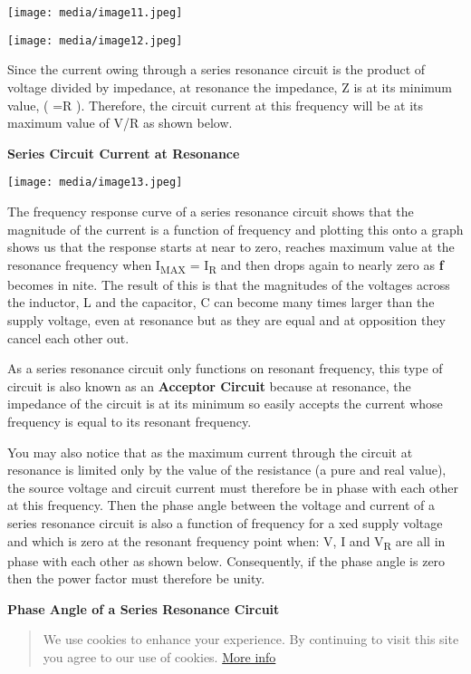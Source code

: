 \documentclass[]{article}
\begin{document}
\texttt{[image: media/image11.jpeg]}

\texttt{[image: media/image12.jpeg]}

Since the current owing through a series resonance circuit is the
product of voltage divided by impedance, at resonance the impedance, Z
is at its minimum value, ( =R ). Therefore, the circuit current at this
frequency will be at its maximum value of V/R as shown below.

\textbf{Series Circuit Current at Resonance}

\texttt{[image: media/image13.jpeg]}

The frequency response curve of a series resonance circuit shows that
the magnitude of the current is a function of frequency and plotting
this onto a graph shows us that the response starts at near to zero,
reaches maximum value at the resonance frequency when
I\textsubscript{MAX} = I\textsubscript{R} and then drops again to nearly
zero as \textbf{ƒ} becomes in nite. The result of this is that the
magnitudes of the voltages across the inductor, L and the capacitor, C
can become many times larger than the supply voltage, even at resonance
but as they are equal and at opposition they cancel each other out.

As a series resonance circuit only functions on resonant frequency, this
type of circuit is also known as an \textbf{Acceptor Circuit} because at
resonance, the impedance of the circuit is at its minimum so easily
accepts the current whose frequency is equal to its resonant frequency.

You may also notice that as the maximum current through the circuit at
resonance is limited only by the value of the resistance (a pure and
real value), the source voltage and circuit current must therefore be in
phase with each other at this frequency. Then the phase angle between
the voltage and current of a series resonance circuit is also a function
of frequency for a xed supply voltage and which is zero at the resonant
frequency point when: V, I and V\textsubscript{R} are all in phase with
each other as shown below. Consequently, if the phase angle is zero then
the power factor must therefore be unity.

\textbf{Phase Angle of a Series Resonance Circuit}

\begin{quote}
We use cookies to enhance your experience. By continuing to visit this
site you agree to our use of cookies.
\href{http://wikipedia.org/wiki/HTTP_cookie}{More info}
\end{quote}
\end{document}
